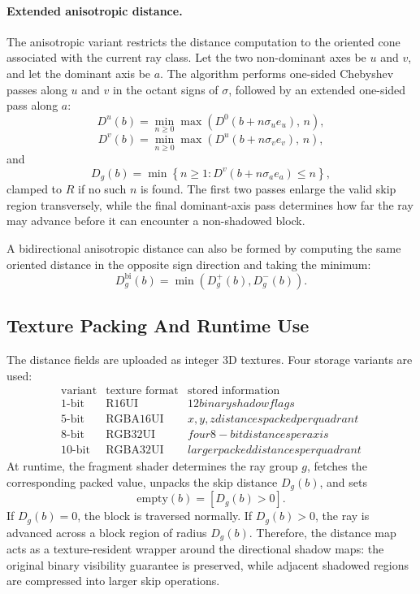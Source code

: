 \paragraph{Extended anisotropic distance.}
The anisotropic variant restricts the distance computation to the oriented
cone associated with the current ray class.  Let the two non-dominant axes be
\(u\) and \(v\), and let the dominant axis be \(a\).  The algorithm performs
one-sided Chebyshev passes along \(u\) and \(v\) in the octant signs of
\(\sigma\), followed by an extended one-sided pass along \(a\):
\[
    D^{u}(b)
    =
    \min_{n\geq 0}
    \max\left(D^{0}(b+n\sigma_u e_u),\, n\right),
\]
\[
    D^{v}(b)
    =
    \min_{n\geq 0}
    \max\left(D^{u}(b+n\sigma_v e_v),\, n\right),
\]
and
\[
    D_g(b)
    =
    \min\left\{
        n\geq 1:
        D^{v}(b+n\sigma_a e_a) \leq n
    \right\},
\]
clamped to \(R\) if no such \(n\) is found.  The first two passes enlarge the
valid skip region transversely, while the final dominant-axis pass determines
how far the ray may advance before it can encounter a non-shadowed block.

A bidirectional anisotropic distance can also be formed by computing the same
oriented distance in the opposite sign direction and taking the minimum:
\[
    D_g^{\mathrm{bi}}(b)
    =
    \min\left(D_g^{+}(b),D_g^{-}(b)\right).
\]

\subsection{Texture Packing And Runtime Use}

The distance fields are uploaded as integer 3D textures.  Four storage variants
are used:
\[
\begin{array}{c|c|c}
\text{variant} & \text{texture format} & \text{stored information} \\
\hline
\text{1-bit}  & \mathrm{R16UI}    & 12 binary shadow flags \\
\text{5-bit}  & \mathrm{RGBA16UI} & x,y,z distances packed per quadrant \\
\text{8-bit}  & \mathrm{RGB32UI}  & four 8-bit distances per axis \\
\text{10-bit} & \mathrm{RGBA32UI} & larger packed distances per quadrant
\end{array}
\]
At runtime, the fragment shader determines the ray group \(g\), fetches the
corresponding packed value, unpacks the skip distance \(D_g(b)\), and sets
\[
    \mathrm{empty}(b) = [D_g(b)>0].
\]
If \(D_g(b)=0\), the block is traversed normally.  If \(D_g(b)>0\), the ray is
advanced across a block region of radius \(D_g(b)\).  Therefore, the distance
map acts as a texture-resident wrapper around the directional shadow maps:
the original binary visibility guarantee is preserved, while adjacent shadowed
regions are compressed into larger skip operations.


